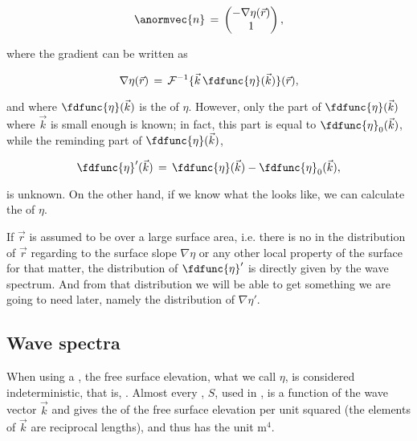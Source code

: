 {\begin{equation}
\anormvec{n} \,=\, \left(\!\!\!\begin{array}{c}-\nabla\eta(\vec{r}) \\ 1\end{array}\!\!\!\right),
\end{equation}

where the gradient can be written as

\begin{equation}
\nabla\eta(\vec{r}) \,=\, \mathcal{F}^{-1}\{\vec{k}\,\fdfunc{\eta}(\vec{k})\}(\vec{r}),
\end{equation}

and where $\fdfunc{\eta}(\vec{k})$ is the  of $\eta$. However, only the part of $\fdfunc{\eta}(\vec{k})$ where $\vec{k}$ is small enough is known; in fact, this part is equal to $\fdfunc{\eta}_0(\vec{k})$, while the reminding part of $\fdfunc{\eta}(\vec{k})$,

\begin{equation}
\fdfunc{\eta}'(\vec{k}) \,=\, \fdfunc{\eta}(\vec{k}) - \fdfunc{\eta}_0(\vec{k}),
\end{equation}

is unknown. On the other hand, if we know what the  looks like, we can calculate the  of $\eta$.

If $\vec{r}$ is assumed to be  over a large surface area, i.e. there is no \bias in the distribution of $\vec{r}$ regarding to the surface slope $\nabla\eta$ or any other local property of the surface for that matter, the distribution of $\fdfunc{\eta}'$ is directly given by the wave spectrum. And from that distribution we will be able to get something we are going to need later, namely the distribution of $\nabla\eta'$.

\subsection{Wave spectra}

When using a , the free surface elevation, what we call $\eta$, is considered indeterministic, that is, \stochastic. Almost every , $S$, used in , is a function of the wave vector $\vec{k}$ and gives the \variance of the free surface elevation per unit  squared (the elements of $\vec{k}$ are reciprocal lengths), and thus has the unit $\text{m}^4$. 

}

